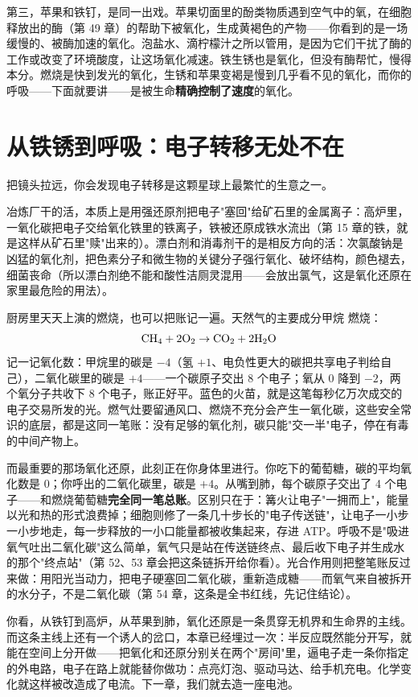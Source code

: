 第三，苹果和铁钉，是同一出戏。苹果切面里的酚类物质遇到空气中的氧，在细胞释放出的酶（第 49 章）的帮助下被氧化，生成黄褐色的产物——你看到的是一场缓慢的、被酶加速的氧化。泡盐水、滴柠檬汁之所以管用，是因为它们干扰了酶的工作或改变了环境酸度，让这场氧化减速。铁生锈也是氧化，但没有酶帮忙，慢得本分。燃烧是快到发光的氧化，生锈和苹果变褐是慢到几乎看不见的氧化，而你的呼吸——下面就要讲——是被生命\textbf{精确控制了速度}的氧化。

\section{从铁锈到呼吸：电子转移无处不在}

把镜头拉远，你会发现电子转移是这颗星球上最繁忙的生意之一。

冶炼厂干的活，本质上是用强还原剂把电子"塞回"给矿石里的金属离子：高炉里，一氧化碳把电子交给氧化铁里的铁离子，铁被还原成铁水流出（第 15 章的铁，就是这样从矿石里"赎"出来的）。漂白剂和消毒剂干的是相反方向的活：次氯酸钠是凶猛的氧化剂，把色素分子和微生物的关键分子强行氧化、破坏结构，颜色褪去，细菌丧命（所以漂白剂绝不能和酸性洁厕灵混用——会放出氯气，这是氧化还原在家里最危险的用法）。

厨房里天天上演的燃烧，也可以把账记一遍。天然气的主要成分甲烷  燃烧：\[\mathrm{CH_4} + \mathrm{2O_2} \rightarrow \mathrm{CO_2} + \mathrm{2H_2O}\]记一记氧化数：甲烷里的碳是 $-4$（氢 $+1$、电负性更大的碳把共享电子判给自己），二氧化碳里的碳是 $+4$——一个碳原子交出 8 个电子；氧从 0 降到 $-2$，两个氧分子共收下 8 个电子，账正好平。蓝色的火苗，就是这笔每秒亿万次成交的电子交易所发的光。燃气灶要留通风口、燃烧不充分会产生一氧化碳，这些安全常识的底层，都是这同一笔账：没有足够的氧化剂，碳只能"交一半"电子，停在有毒的中间产物上。

而最重要的那场氧化还原，此刻正在你身体里进行。你吃下的葡萄糖，碳的平均氧化数是 0；你呼出的二氧化碳里，碳是 $+4$。从嘴到肺，每个碳原子交出了 4 个电子——和燃烧葡萄糖\textbf{完全同一笔总账}。区别只在于：篝火让电子"一拥而上"，能量以光和热的形式浪费掉；细胞则修了一条几十步长的"电子传送链"，让电子一小步一小步地走，每一步释放的一小口能量都被收集起来，存进 ATP。呼吸不是"吸进氧气吐出二氧化碳"这么简单，氧气只是站在传送链终点、最后收下电子并生成水的那个"终点站"（第 52、53 章会把这条链拆开给你看）。光合作用则把整笔账反过来做：用阳光当动力，把电子硬塞回二氧化碳，重新造成糖——而氧气来自被拆开的水分子，不是二氧化碳（第 54 章，这条是全书红线，先记住结论）。

你看，从铁钉到高炉，从苹果到肺，氧化还原是一条贯穿无机界和生命界的主线。而这条主线上还有一个诱人的岔口，本章已经埋过一次：半反应既然能分开写，就能在空间上分开做——把氧化和还原分别关在两个"房间"里，逼电子走一条你指定的外电路，电子在路上就能替你做功：点亮灯泡、驱动马达、给手机充电。化学变化就这样被改造成了电流。下一章，我们就去造一座电池。

